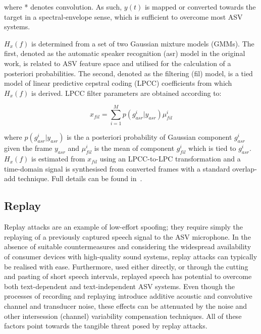 \noindent where * denotes convolution. As such, $y(t)$ is mapped or converted towards the target in a spectral-envelope sense, which is sufficient to overcome most ASV systems. 

$H_x(f)$ is determined from a set of two Gaussian mixture models (GMMs).  The first, denoted as the automatic speaker recognition (asr) model in the original work, is related to ASV feature space and utilised for the calculation of a posteriori probabilities.  The second, denoted as the filtering (fil) model, is a tied model of linear predictive cepstral coding (LPCC) coefficients from which $H_x(f)$ is derived.  LPCC filter parameters are obtained according to:

\begin{equation}
x_{fil} = \sum\limits_{i=1}^{M}p(g_{asr}^{i}|y_{asr}) \mu_{fil}^{i}
\label{eq:EMit}
\end{equation}

\noindent where $p(g_{asr}^{i}|y_{asr})$ is the a posteriori probability of Gaussian component $g_{asr}^{i}$ given the frame $y_{asr}$ and $\mu_{fil}^{i}$ is the mean of component $g_{fil}^{i}$ which is tied to $g_{asr}^{i}$.  $H_{x}(f)$ is estimated from $x_{fil}$ using an LPCC-to-LPC transformation and a time-domain signal is synthesised from converted frames with a standard overlap-add technique. Full details can be found in~\cite{Matrouf2005, Bonastre2006, Bonastre2007}.


\subsection{Replay}
\label{ssec:replay}

Replay attacks are an example of low-effort spoofing; they require simply the replaying of a previously captured speech signal to the ASV microphone.  
In the absence of suitable countermeasures and considering the widespread availability of consumer devices with high-quality sound systems, replay attacks can typically be realised with ease.  Furthermore, used either directly, or through the cutting and pasting of short speech intervals, replayed speech has potential to overcome both text-dependent and text-independent ASV systems.  Even though the processes of recording and replaying introduce additive acoustic and convolutive channel and transducer noise, these effects can be attenuated by the noise and other intersession (channel) variability compensation techniques.  All of these factors point towards the tangible threat posed by replay attacks.

